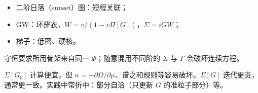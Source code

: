 \begin{itemize}
  \item 二阶日落（sunset）图：短程关联；
  \item GW：环穿衣，$W=v/(1-v\Pi[G])$，$\Sigma=iGW$；
  \item 梯子：低密、硬核。
\end{itemize}
守恒要求所用骨架来自同一 $\Phi$；随意混用不同阶的 $\Sigma$ 与 $\Gamma$ 会破坏连续方程。

\begin{example}[与非自洽的差别]
$\Sigma[G_0]$ 计算便宜，但 $n=-\partial\Omega/\partial\mu$、谱之和规则等容易破坏。$\Sigma[G]$ 迭代更贵，通常更一致。实践中常折中：部分自洽（只更新 $G$ 的准粒子部分）等。
\end{example}
